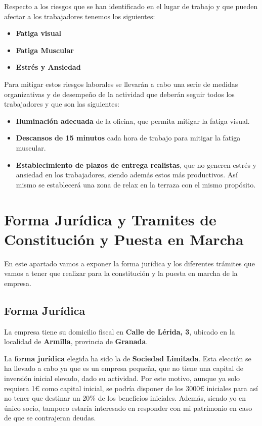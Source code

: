 Respecto a los riesgos que se han identificado en el lugar de trabajo y que pueden afectar a los trabajadores tenemos los siguientes:

\begin{itemize}
    \item \textbf{Fatiga visual}
    \item \textbf{Fatiga Muscular}
    \item \textbf{Estrés y Ansiedad}
\end{itemize}

Para mitigar estos riesgos laborales se llevarán a cabo una serie de medidas organizativas y de desempeño de la actividad que deberán seguir todos los trabajadores y que son las siguientes:

\begin{itemize}
    \item \textbf{Iluminación adecuada} de la oficina, que permita mitigar la fatiga visual.
    \item \textbf{Descansos de 15 minutos} cada hora de trabajo para mitigar la fatiga muscular.
    \item \textbf{Establecimiento de plazos de entrega realistas}, que no generen estrés y ansiedad en los trabajadores, siendo además
    estos más productivos. Así mismo se establecerá una zona de relax en la terraza con el mismo propósito.
\end{itemize}

\section{Forma Jurídica y Tramites de Constitución y Puesta en Marcha}
En este apartado vamos a exponer la forma jurídica y los diferentes trámites que vamos a tener que realizar para la constitución y la puesta en marcha de la empresa.

\subsection{Forma Jurídica}
La empresa tiene su domicilio fiscal en \textbf{Calle de Lérida, 3}, ubicado en la localidad de \textbf{Armilla}, provincia de \textbf{Granada}.

La \textbf{forma jurídica} elegida ha sido la de \textbf{Sociedad Limitada}. Esta elección se ha llevado a cabo ya que es un empresa pequeña, que no tiene una capital de inversión inicial elevado, dado su actividad. Por este motivo, aunque ya solo requiera 1€ como capital inicial, se podría disponer de los 3000€ iniciales para así no tener que destinar un 20\% de los beneficios iniciales. Además, siendo yo en único socio, tampoco estaría interesado en responder con mi patrimonio en caso de que se contrajeran deudas.

